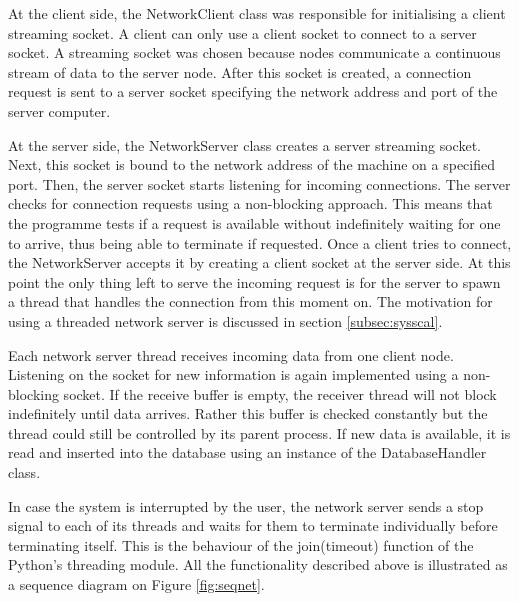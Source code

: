 At the client side, the \textsf{NetworkClient} class was responsible for initialising a client streaming socket. A client  can only use a client socket to connect to a server socket. A streaming socket was chosen because nodes communicate a continuous stream of data to the server node. After this socket is created, a connection request is sent to a server socket specifying the network address and port of the server computer.

At the server side, the \textsf{NetworkServer} class creates a server streaming socket. Next, this socket is bound to the network address of the machine on a specified port. Then, the server socket starts listening for incoming connections. The server checks for connection requests using a non-blocking approach. This means that the programme tests if a request is available without indefinitely waiting for one to arrive, thus being able to terminate if requested. Once a client tries to connect, the \textsf{NetworkServer} accepts it by creating a client socket at the server side. At this point the only thing left to serve the incoming request is for the server to spawn a thread that handles the connection from this moment on. The motivation for using a threaded network server is discussed in section \ref{subsec:sysscal}.

Each network server thread receives incoming data from one client node. Listening on the socket for new information is again implemented using a non-blocking socket. If the receive buffer is empty, the receiver thread will not block indefinitely until data arrives. Rather this buffer is checked constantly but the thread could still be controlled by its parent process. If new data is available, it is read and inserted into the database using an instance of the \textsf{DatabaseHandler} class.

In case the system is interrupted by the user, the network server sends a stop signal to each of its threads and waits for them to terminate individually before terminating itself. This is the behaviour of the \textsf{join(timeout)} function of the Python's \textsf{threading} module. All the functionality described above is illustrated as a sequence diagram on Figure
\ref{fig:seqnet}.

